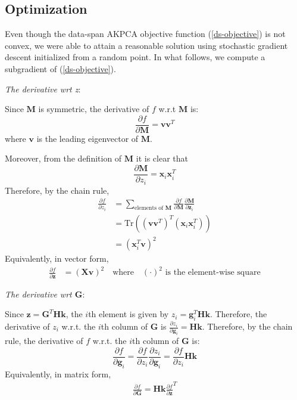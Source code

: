 \documentclass[]{article}
\begin{document}
\subsection{Optimization}

Even though the data-span AKPCA objective function (\ref{ds-objective}) is not convex, we were able to attain a reasonable solution using stochastic gradient descent initialized from a random point.
In what follows, we compute a subgradient of (\ref{ds-objective}).

\textit{The derivative wrt z}:

Since $\mathbf{M}$ is symmetric, the derivative of $f$ w.r.t $\mathbf{M}$ is:
$$ \frac{\partial f}{\partial \mathbf{M}} = \mathbf{v} \mathbf{v}^T  $$
where $\mathbf{v}$ is the leading eigenvector of $\mathbf{M}$.

Moreover, from the definition of $\mathbf{M}$ it is clear that
$$\frac{\partial \mathbf{M}}{\partial z_i} = \mathbf{x}_i \mathbf{x}_i^T$$
Therefore, by the chain rule, 
\begin{align*}
 \frac{\partial f}{\partial z_i} &= \sum_{\text{elements of $\mathbf{M}$}} \frac{\partial f}{\partial \mathbf{M}} \frac{\partial \mathbf{M}}{\partial \mathbf{z}_i} \\
&= \text{Tr}((\mathbf{v} \mathbf{v}^T)^T (\mathbf{x}_i \mathbf{x}_i^T)) \\
&= (\mathbf{x}_i^T \mathbf{v})^2
\end{align*}
Equivalently, in vector form,
\begin{align}
\frac{\partial f}{\partial \mathbf{z}} &= (\mathbf{X} \mathbf{v})^2 \quad \text{where} \quad (\cdot)^2 \text{ is the element-wise square}
\end{align}

\textit{The derivative wrt $\mathbf{G}$}:

Since $\mathbf{z} = \mathbf{G}^T \mathbf{H} \mathbf{k}$, the $i$th element is given by  $z_i = \mathbf{g}_i^T\mathbf{H} \mathbf{k}$. 
Therefore, the derivative of $z_i$ w.r.t. the $i$th column of $\mathbf{G}$ is $\frac{\partial z_i}{\partial \mathbf{g}_i} = \mathbf{H} \mathbf{k}$.
Therefore, by the chain rule, the derivative of $f$ w.r.t. the $i$th column of $\mathbf{G}$ is:
$$ \frac{\partial f}{\partial \mathbf{g}_i} =   \frac{\partial f}{\partial z_i} \frac{\partial z_i}{\partial \mathbf{g}_i} = \frac{\partial f}{\partial z_i} \mathbf{H} \mathbf{k} $$
Equivalently, in matrix form,
\begin{align}
\frac{\partial f}{\partial \mathbf{G}}  = \mathbf{H} \mathbf{k} \frac{\partial f}{\partial \mathbf{z}}^T
\end{align}
\end{document}

